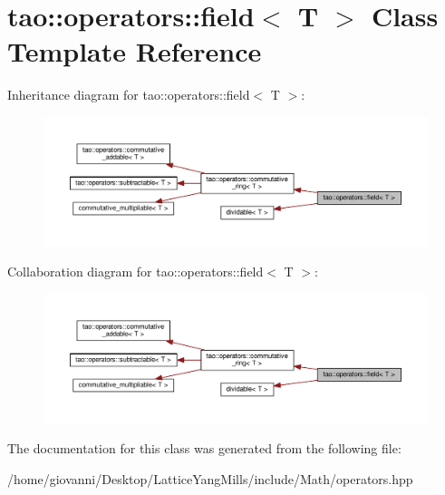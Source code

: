 \hypertarget{classtao_1_1operators_1_1field_3_01T_01_4}{}\section{tao\+:\+:operators\+:\+:field$<$ T $>$ Class Template Reference}
\label{classtao_1_1operators_1_1field_3_01T_01_4}


Inheritance diagram for tao\+:\+:operators\+:\+:field$<$ T $>$\+:\nopagebreak
\begin{figure}[H]
\begin{center}
\leavevmode
\includegraphics[width=350pt]{classtao_1_1operators_1_1field_3_01T_01_4__inherit__graph}
\end{center}
\end{figure}


Collaboration diagram for tao\+:\+:operators\+:\+:field$<$ T $>$\+:\nopagebreak
\begin{figure}[H]
\begin{center}
\leavevmode
\includegraphics[width=350pt]{classtao_1_1operators_1_1field_3_01T_01_4__coll__graph}
\end{center}
\end{figure}


The documentation for this class was generated from the following file\+:\begin{DoxyCompactItemize}
\item 
/home/giovanni/\+Desktop/\+Lattice\+Yang\+Mills/include/\+Math/operators.\+hpp\end{DoxyCompactItemize}
